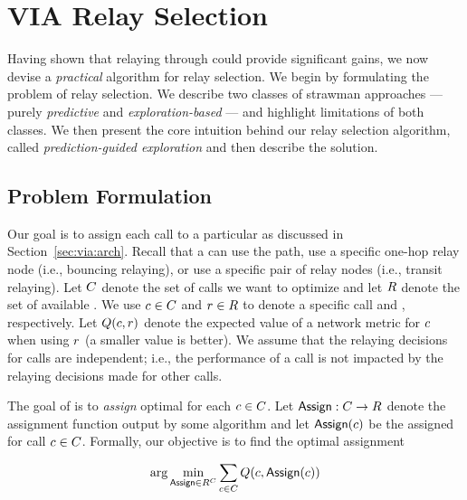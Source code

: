 \section{VIA Relay Selection}
\label{sec:via:design}

Having shown that relaying through \hybrid could provide significant gains, 
we now devise a {\em practical} algorithm for relay selection. 
 We begin by formulating the problem of relay selection. We describe 
 two classes of strawman approaches --- purely {\em predictive} and {\em exploration-based} ---
 and highlight limitations of both classes. We then present
 the core intuition behind our relay selection algorithm, called {\em prediction-guided exploration} and then describe 
 the solution. 

 
\subsection{Problem Formulation} 

Our goal  is to assign each call  to a particular \option as discussed in
Section~\ref{sec:via:arch}.  Recall that a \option can use the \direct
path, use a specific one-hop relay node (i.e., bouncing relaying), or use a specific pair of 
relay nodes (i.e., transit relaying).  Let  $C$ denote the set of calls we want to 
optimize and  let $R$ denote the set of available \options. 
 We use $c \in C$ and   $r \in
R$ to denote a specific call and \option, respectively.
 Let $Q(c, r)$ denote the expected  
 {value of a network metric for} $c$  when using $r$ {(a smaller value is better)}.
We assume that the relaying decisions for calls are independent; i.e., the performance of a call is not impacted by the relaying decisions made for other calls.


The
goal of \hybrid is to  {\em assign} optimal \options
 for each $c \in C$. Let ${\sf\small Assign}:C \rightarrow R$ denote 
 the assignment function output by some algorithm and 
 let ${\sf\small Assign}(c)$ be the \option assigned for call $c\in C$.
 Formally, our objective is to find  the optimal 
 assignment
 
\begin{displaymath}\arg\min_{{\sf\small Assign} \in R^C}  \sum_{c\in C}Q(c, {\sf\small Assign}(c))
\end{displaymath}

